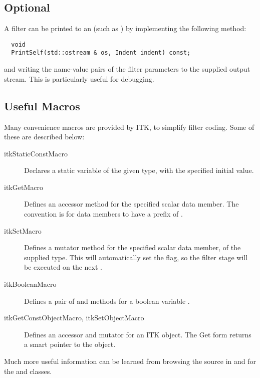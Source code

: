 \subsection{Optional}

A filter can be printed to an  (such as )
by implementing the following method:

\begin{verbatim}
  void
  PrintSelf(std::ostream & os, Indent indent) const;
\end{verbatim}

\noindent and writing the name-value pairs of the filter parameters to the
supplied output stream.  This is particularly useful for debugging.

\subsection{Useful Macros}

Many convenience macros are provided by ITK, to simplify filter coding.
Some of these are described below:

\begin{description}
\item [itkStaticConstMacro] Declares a static variable of the given type,
  with the specified initial value.
\item [itkGetMacro] Defines an accessor method for the specified scalar data
  member.  The convention is for data members to have a prefix of
  .
\item [itkSetMacro] Defines a mutator method for the specified scalar data
  member, of the supplied type.  This will automatically set the
   flag, so the filter stage will be executed on the next
  .
\item [itkBooleanMacro] Defines a pair of  and 
  methods for a boolean variable .
\item [itkGetConstObjectMacro, itkSetObjectMacro] Defines an accessor and mutator
  for an ITK object.  The Get form returns a smart pointer to the object.
\end{description}

Much more useful information can be learned from browsing the source in
 and for the  and
 classes.



%
%



%
%
